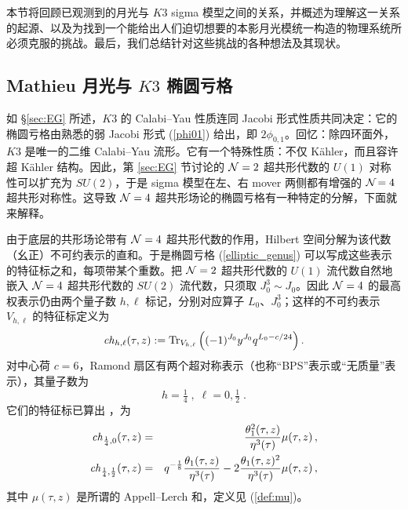 \documentclass[11pt,a4paper,fontset=windows]{ctexart}
\numberwithin{equation}{section}
\def\f{\phi}
\def\m{\mu}
\def\t{\tau}
\def\th{\theta}
\newcommand{\tr}{\operatorname{Tr}}
\newcommand{\bea}{\begin{eqnarray}}
\newcommand{\eea}{\end{eqnarray}}
\newcommand{\eq}[1]{(\ref{#1})}
\begin{document}

本节将回顾已观测到的月光与 $K3$ sigma 模型之间的关系，并概述为理解这一关系的起源、以及为找到一个能给出人们迫切想要的本影月光模统一构造的物理系统所必须克服的挑战。最后，我们总结针对这些挑战的各种想法及其现状。

\subsection{Mathieu 月光与 $K3$ 椭圆亏格}
\label{sec:M24moonshine}

如 \S\ref{sec:EG} 所述，$K3$ 的 Calabi--Yau 性质连同 Jacobi 形式性质共同决定：它的椭圆亏格由熟悉的弱 Jacobi 形式 \eq{phi01} 给出，即 $2\f_{0,1}$。回忆：除四环面外，$K3$ 是唯一的二维 Calabi--Yau 流形。它有一个特殊性质：不仅 K\"ahler，而且容许超 K\"ahler 结构。因此，第 \ref{sec:EG} 节讨论的 ${\cal N}=2$ 超共形代数的 $U(1)$ 对称性可以扩充为 $SU(2)$，于是 sigma 模型在左、右 mover 两侧都有增强的 ${\cal N}\!=4$ 超共形对称性。这导致 ${\cal N}=4$ 超共形场论的椭圆亏格有一种特定的分解，下面就来解释。

由于底层的共形场论带有 ${\cal N}=4$ 超共形代数的作用，Hilbert 空间分解为该代数（幺正）不可约表示的直和。于是椭圆亏格 (\ref{elliptic_genus}) 可以写成这些表示的特征标之和，每项带某个重数。把 ${\cal N}=2$ 超共形代数的 $U(1)$ 流代数自然地嵌入 ${\cal N}=4$ 超共形代数的 $SU(2)$ 流代数，只须取 $J_0^3 \sim J_0$。因此 ${\cal N}=4$ 的最高权表示仍由两个量子数 $h,\ell$ 标记，分别对应算子 $L_0$、$J_0^3$；这样的不可约表示 $V_{h,\ell}$ 的特征标定义为
$$
{\it ch}_{h,\ell}(\t,z) := \tr_{V_{h,\ell}} \left( (-1)^{J_0}y^{J_0} q^{L_0-c/24}\right) .
$$
对中心荷 $c=6$，Ramond 扇区有两个超对称表示（也称“BPS”表示或“无质量”表示），其量子数为
$$
h=\tfrac{1}{4}\;,\; \ell = 0 ,\tfrac{1}{2} \;.
$$
它们的特征标已算出 \cite{Eguchi1987,Eguchi1988,Eguchi1988a}，为
\bea\label{massless_characters}
{\it ch}_{\frac{1}{4},0}(\t,z) &=& \frac{\th_1^2(\t,z)}{\eta^3(\t)} \m(\t,z)\, ,\\\notag
{\it ch}_{\frac{1}{4},\frac{1}{2}}(\t,z) &=& q^{-\frac{1}{8}} \frac{\th_1(\t,z)}{\eta^3(\t)} - 2 \frac{\th_1(\t,z)^2}{\eta^3(\t)} \m(\t,z)\, ,
\eea 
其中 $\m(\t,z)$ 是所谓的 Appell--Lerch 和，定义见 \eq{def:mu}。
\end{document}
